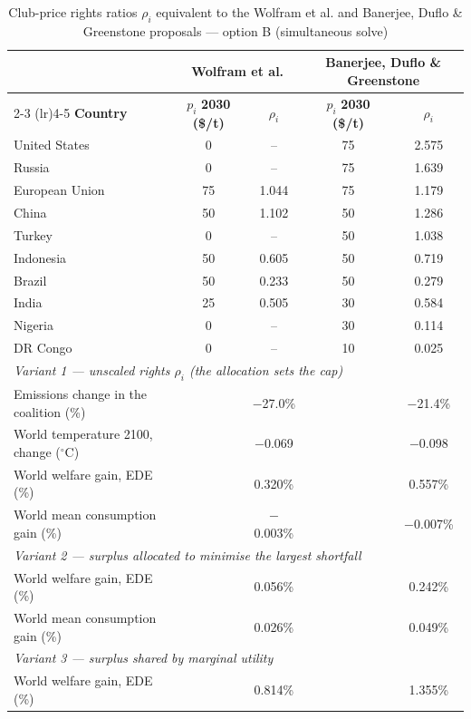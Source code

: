 \begin{table}[htbp]
\centering
\small
\caption{Club-price rights ratios $\rho_i$ equivalent to the Wolfram et al. and Banerjee, Duflo \& Greenstone proposals --- option B (simultaneous solve)}
\renewcommand{\arraystretch}{1.15}
\begin{tabular}{lcccc}
  \toprule
  & \multicolumn{2}{c}{\textbf{Wolfram et al.}} & \multicolumn{2}{c}{\textbf{Banerjee, Duflo \& Greenstone}} \\
  \cmidrule(lr){2-3} \cmidrule(lr){4-5}
  \textbf{Country} & $p_i$ \textbf{2030 (\$/t)} & $\rho_i$ & $p_i$ \textbf{2030 (\$/t)} & $\rho_i$ \\
  \midrule
  United States & 0 & -- & 75 & 2.575 \\
  Russia & 0 & -- & 75 & 1.639 \\
  European Union & 75 & 1.044 & 75 & 1.179 \\
  China & 50 & 1.102 & 50 & 1.286 \\
  Turkey & 0 & -- & 50 & 1.038 \\
  Indonesia & 50 & 0.605 & 50 & 0.719 \\
  Brazil & 50 & 0.233 & 50 & 0.279 \\
  India & 25 & 0.505 & 30 & 0.584 \\
  Nigeria & 0 & -- & 30 & 0.114 \\
  DR Congo & 0 & -- & 10 & 0.025 \\
  \midrule
  \multicolumn{5}{l}{\textit{Variant 1 --- unscaled rights $\rho_i$ (the allocation sets the cap)}} \\
  \quad Emissions change in the coalition (\%) &  & $-$27.0\% &  & $-$21.4\% \\
  \quad World temperature 2100, change ($^\circ$C) &  & $-$0.069 &  & $-$0.098 \\
  \quad World welfare gain, EDE (\%) &  & 0.320\% &  & 0.557\% \\
  \quad World mean consumption gain (\%) &  & $-$0.003\% &  & $-$0.007\% \\
  \midrule
  \multicolumn{5}{l}{\textit{Variant 2 --- surplus allocated to minimise the largest shortfall}} \\
  \quad World welfare gain, EDE (\%) &  & 0.056\% &  & 0.242\% \\
  \quad World mean consumption gain (\%) &  & 0.026\% &  & 0.049\% \\
  \midrule
  \multicolumn{5}{l}{\textit{Variant 3 --- surplus shared by marginal utility}} \\
  \quad World welfare gain, EDE (\%) &  & 0.814\% &  & 1.355\% \\

\end{tabular}
\end{table}
